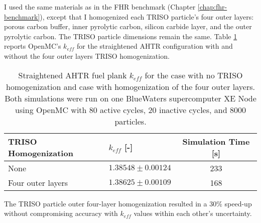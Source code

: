 I used the same materials as in the \gls{FHR} benchmark (Chapter \ref{chap:fhr-benchmark}), 
except that I homogenized each \gls{TRISO} particle's four outer layers: 
porous carbon buffer, inner pyrolytic carbon, silicon carbide layer, and the 
outer pyrolytic carbon. 
The \gls{TRISO} particle dimensions remain the same.
Table \ref{tab:keff_triso} reports OpenMC's $k_{eff}$ for the straightened \gls{AHTR} configuration 
with and without the four outer layers \gls{TRISO} homogenization.
\begin{table}[htbp]
    \centering
    \onehalfspacing
    \caption{Straightened \acrfull{AHTR} fuel plank $k_{eff}$ for the case with 
    no \gls{TRISO} homogenization and case with homogenization of the four outer 
    layers. Both simulations were run on one BlueWaters supercomputer XE Node 
    \cite{ncsa_about_2017} using OpenMC \cite{romano_openmc:_2015} with 80 active 
    cycles, 20 inactive cycles, and 8000 particles.}
	\label{tab:keff_triso}
    \footnotesize
    \begin{tabular}{llc}
    \hline 
    \textbf{TRISO Homogenization}& \textbf{$k_{eff}$ [-]} & \textbf{Simulation Time [s]}  \\
    \hline 
    None & $1.38548 \pm 0.00124$ & 233\\ 
    Four outer layers & $1.38625 \pm 0.00109$ & 168\\ 
    \hline
    \end{tabular}
\end{table}

The \gls{TRISO} particle outer four-layer homogenization resulted in a $30\%$ 
speed-up without compromising accuracy with $k_{eff}$ values within each 
other's uncertainty.

